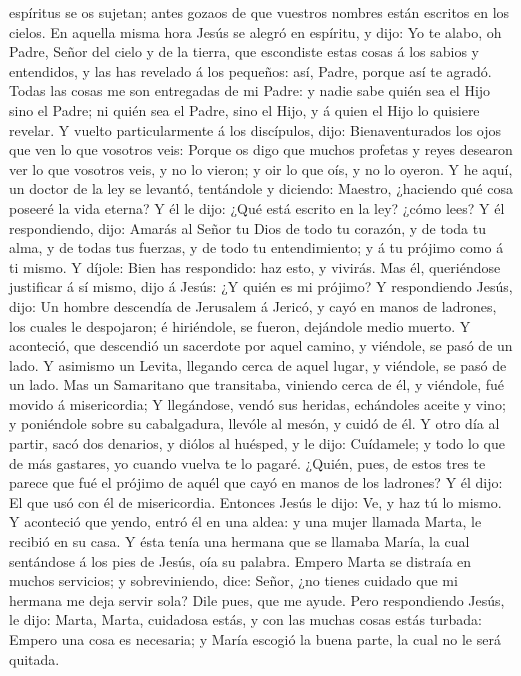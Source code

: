 espíritus se os sujetan; antes gozaos de que vuestros nombres están
escritos en los cielos.  En aquella misma hora Jesús se
alegró en espíritu, y dijo: Yo te alabo, oh Padre, Señor del cielo y de
la tierra, que escondiste estas cosas á los sabios y entendidos, y las
has revelado á los pequeños: así, Padre, porque así te agradó.
 Todas las cosas me son entregadas de mi Padre: y nadie
sabe quién sea el Hijo sino el Padre; ni quién sea el Padre, sino el
Hijo, y á quien el Hijo lo quisiere revelar.  Y vuelto
particularmente á los discípulos, dijo: Bienaventurados los ojos que ven
lo que vosotros veis:  Porque os digo que muchos profetas
y reyes desearon ver lo que vosotros veis, y no lo vieron; y oir lo que
oís, y no lo oyeron.  Y he aquí, un doctor de la ley se
levantó, tentándole y diciendo: Maestro, ¿haciendo qué cosa poseeré la
vida eterna?  Y él le dijo: ¿Qué está escrito en la ley?
¿cómo lees?  Y él respondiendo, dijo: Amarás al Señor tu
Dios de todo tu corazón, y de toda tu alma, y de todas tus fuerzas, y de
todo tu entendimiento; y á tu prójimo como á ti mismo.  Y
díjole: Bien has respondido: haz esto, y vivirás.  Mas
él, queriéndose justificar á sí mismo, dijo á Jesús: ¿Y quién es mi
prójimo?  Y respondiendo Jesús, dijo: Un hombre descendía
de Jerusalem á Jericó, y cayó en manos de ladrones, los cuales le
despojaron; é hiriéndole, se fueron, dejándole medio muerto.
 Y aconteció, que descendió un sacerdote por aquel
camino, y viéndole, se pasó de un lado.  Y asimismo un
Levita, llegando cerca de aquel lugar, y viéndole, se pasó de un lado.
 Mas un Samaritano que transitaba, viniendo cerca de él,
y viéndole, fué movido á misericordia;  Y llegándose,
vendó sus heridas, echándoles aceite y vino; y poniéndole sobre su
cabalgadura, llevóle al mesón, y cuidó de él.  Y otro día
al partir, sacó dos denarios, y diólos al huésped, y le dijo: Cuídamele;
y todo lo que de más gastares, yo cuando vuelva te lo pagaré.
 ¿Quién, pues, de estos tres te parece que fué el prójimo
de aquél que cayó en manos de los ladrones?  Y él dijo:
El que usó con él de misericordia. Entonces Jesús le dijo: Ve, y haz tú
lo mismo.  Y aconteció que yendo, entró él en una aldea:
y una mujer llamada Marta, le recibió en su casa.  Y ésta
tenía una hermana que se llamaba María, la cual sentándose á los pies de
Jesús, oía su palabra.  Empero Marta se distraía en
muchos servicios; y sobreviniendo, dice: Señor, ¿no tienes cuidado que
mi hermana me deja servir sola? Dile pues, que me ayude. 
Pero respondiendo Jesús, le dijo: Marta, Marta, cuidadosa estás, y con
las muchas cosas estás turbada:  Empero una cosa es
necesaria; y María escogió la buena parte, la cual no le será quitada.

